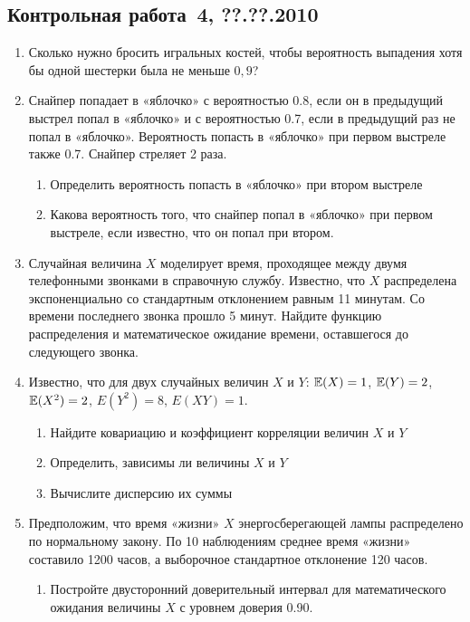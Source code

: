 \documentclass[pdftex,12pt,a4paper]{article}
\begin{document}
\subsection{Контрольная работа \No\,4, ??.??.2010}

\begin{enumerate}

\item Сколько нужно бросить игральных костей, чтобы вероятность выпадения хотя бы одной шестерки была не меньше $0{,}9$?
\item Снайпер попадает в «яблочко» с вероятностью 0.8, если он в предыдущий выстрел попал в «яблочко» и с вероятностью 0.7, если в предыдущий раз не попал в  «яблочко». Вероятность попасть в «яблочко» при первом выстреле также 0.7. Снайпер стреляет 2 раза.
\begin{enumerate}
\item Определить вероятность попасть в «яблочко» при втором выстреле
\item Какова вероятность того, что снайпер попал в «яблочко» при первом выстреле, если известно, что он попал при втором. 
\end{enumerate}
\item Случайная величина $X$ моделирует время, проходящее между двумя телефонными звонками в справочную службу. Известно, что $X$ распределена экспоненциально со стандартным отклонением равным 11 минутам. Со времени последнего звонка прошло 5 минут. Найдите функцию распределения и математическое ожидание времени, оставшегося до следующего звонка.
\item Известно, что для двух случайных величин $X$ и $Y$: $\mathbb{E}(X)=1$, $\mathbb{E}(Y)=2$, $\mathbb{E}(X^2)=2$, $E(Y^2)=8$, $E(XY)=1$. 
\begin{enumerate}
\item Найдите ковариацию и коэффициент корреляции величин $X$ и $Y$
\item Определить, зависимы ли величины $X$ и $Y$
\item Вычислите дисперсию их суммы
\end{enumerate}
\item Предположим, что время «жизни» $X$ энергосберегающей лампы распределено по нормальному закону. По 10 наблюдениям среднее время «жизни» составило 1200 часов, а выборочное стандартное отклонение 120 часов. 
\begin{enumerate}
\item Постройте двусторонний доверительный интервал для математического ожидания величины $X$ с уровнем доверия 0.90.

\end{enumerate}
\end{enumerate}
\end{document}

